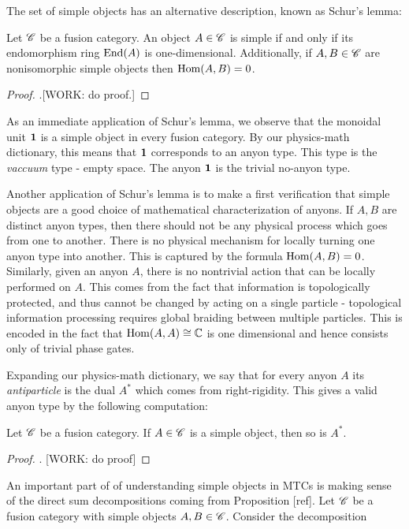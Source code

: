 The set of simple objects has an alternative description, known as Schur's lemma:

\begin{proposition} Let $\mathscr{C}$ be a fusion category. An object $A\in \mathscr{C}$ is simple if and only if its endomorphism ring $\operatorname{End}(A)$ is one-dimensional. Additionally, if $A,B\in \mathscr{C}$ are nonisomorphic simple objects then $\operatorname{Hom}(A,B)=0$.
\end{proposition}
\begin{proof}.[WORK: do proof.]
\end{proof}

As an immediate application of Schur's lemma, we observe that the monoidal unit $\mathbf{1}$ is a simple object in every fusion category. By our physics-math dictionary, this means that $\mathbf{1}$ corresponds to an anyon type. This type is the \textit{vaccuum} type - empty space. The anyon $\mathbf{1}$ is the trivial no-anyon type.

Another application of Schur's lemma is to make a first verification that simple objects are a good choice of mathematical characterization of anyons. If $A,B$ are distinct anyon types, then there should not be any physical process which goes from one to another. There is no physical mechanism for locally turning one anyon type into another. This is captured by the formula $\operatorname{Hom}(A,B)=0$. Similarly, given an anyon $A$, there is no nontrivial action that can be locally performed on $A$. This comes from the fact that information is topologically protected, and thus cannot be changed by acting on a single particle - topological information processing requires global braiding between multiple particles. This is encoded in the fact that $\operatorname{Hom}(A,A)\cong \mathbb{C}$ is one dimensional and hence consists only of trivial phase gates.

Expanding our physics-math dictionary, we say that for every anyon $A$ its \textit{antiparticle} is the dual $A^*$ which comes from right-rigidity. This gives a valid anyon type by the following computation:

\begin{proposition} Let $\mathscr{C}$ be a fusion category. If $A\in \mathscr{C}$ is a simple object, then so is $A^*$.
\end{proposition}
\begin{proof}. [WORK: do proof]
\end{proof}

An important part of of understanding simple objects in MTCs is making sense of the direct sum decompositions coming from Proposition [ref]. Let $\mathscr{C}$ be a fusion category with simple objects $A,B\in \mathscr{C}$. Consider the decomposition

